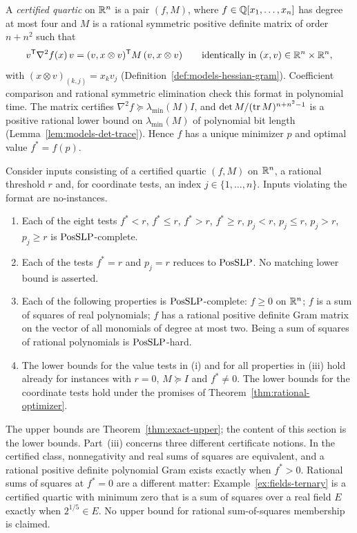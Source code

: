 A \emph{certified quartic} on $\mathbb R^n$ is a pair $(f,M)$, where
$f\in\mathbb Q[x_1,\ldots,x_n]$ has degree at most four and $M$ is a rational
symmetric positive definite matrix of order $n+n^2$ such that
\begin{equation}
 v^{\mathsf T}\nabla^2f(x)\,v=(v,x\otimes v)^{\mathsf T}M\,(v,x\otimes v)
 \qquad\text{identically in }(x,v)\in\mathbb R^n\times\mathbb R^n,
 \label{eq:reductions-certified}
\end{equation}
with $(x\otimes v)_{(k,j)}=x_kv_j$ (Definition~\ref{def:models-hessian-gram}).
Coefficient comparison and rational symmetric elimination check this format in
polynomial time. The matrix certifies $\nabla^2f\succeq\lambda_{\min}(M)I$, and
$\det M/(\operatorname{tr} M)^{n+n^2-1}$ is a positive rational lower bound on
$\lambda_{\min}(M)$ of polynomial bit length
(Lemma~\ref{lem:models-det-trace}). Hence $f$ has a unique minimizer $p$ and
optimal value $f^*=f(p)$.

\begin{theorem}
\label{thm:quartic-complete}
Consider inputs consisting of a certified quartic $(f,M)$ on $\mathbb R^n$, a
rational threshold $r$ and, for coordinate tests, an index
$j\in\{1,\ldots,n\}$. Inputs violating the format are no-instances.
\begin{enumerate}[label=(\roman*)]
\item Each of the eight tests $f^*<r$, $f^*\le r$, $f^*>r$, $f^*\ge r$,
$p_j<r$, $p_j\le r$, $p_j>r$, $p_j\ge r$ is $\mathrm{PosSLP}$-complete.
\item Each of the tests $f^*=r$ and $p_j=r$ reduces to $\mathrm{PosSLP}$. No matching
lower bound is asserted.
\item Each of the following properties is $\mathrm{PosSLP}$-complete: $f\ge0$ on
$\mathbb R^n$; $f$ is a sum of squares of real polynomials; $f$ has a rational
positive definite Gram matrix on the vector of all monomials of degree at most
two. Being a sum of squares of rational polynomials is $\mathrm{PosSLP}$-hard.
\item The lower bounds for the value tests in (i) and for all properties in
(iii) hold already for instances with $r=0$, $M\succeq I$ and $f^*\ne0$. The
lower bounds for the coordinate tests hold under the promises of
Theorem~\ref{thm:rational-optimizer}.
\end{enumerate}
\end{theorem}

The upper bounds are Theorem~\ref{thm:exact-upper}; the content of this
section is the lower bounds. Part~(iii) concerns three different certificate
notions. In the certified class, nonnegativity
and real sums of squares are equivalent, and a rational positive definite
polynomial Gram exists exactly when $f^*>0$. Rational sums of squares at
$f^*=0$ are a different matter: Example~\ref{ex:fields-ternary} is a
certified quartic with minimum zero that is a sum of squares over a real field
$E$ exactly when $2^{1/5}\in E$. No upper bound for rational sum-of-squares
membership is claimed.

